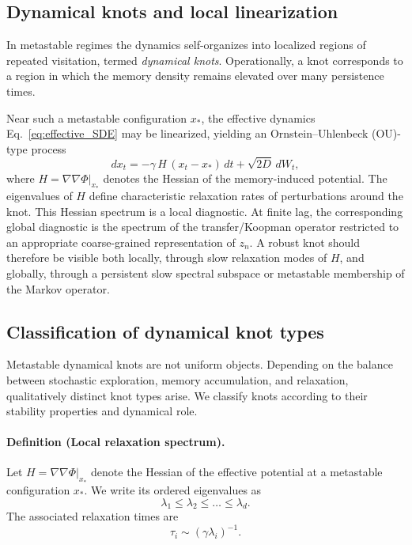 \documentclass[reprint,amsmath,amssymb,aps,prl,nofootinbib,floatfix]{revtex4-2}
\begin{document}
\subsection{Dynamical knots and local linearization}
In metastable regimes the dynamics self-organizes into localized regions of repeated visitation, termed \emph{dynamical knots}. 
Operationally, a knot corresponds to a region in which the memory density remains elevated over many persistence times.

Near such a metastable configuration $x_\ast$, the effective dynamics Eq.~\eqref{eq:effective_SDE} may be linearized, yielding an Ornstein--Uhlenbeck (OU)-type process \cite{OrnsteinUhlenbeck1930}
\begin{equation}
dx_t
= -\gamma\,H\,(x_t-x_\ast)\,dt + \sqrt{2D}\,dW_t, \label{eq:OU_local}
\end{equation}
where $H=\nabla\nabla\Phi|_{x_\ast}$ denotes the Hessian of the memory-induced potential.
The eigenvalues of $H$ define characteristic relaxation rates of perturbations around the knot.
This Hessian spectrum is a local diagnostic.
At finite lag, the corresponding global diagnostic is the spectrum of the transfer/Koopman operator restricted to an appropriate coarse-grained representation of $z_n$.
A robust knot should therefore be visible both locally, through slow relaxation modes of $H$, and globally, through a persistent slow spectral subspace or metastable membership of the Markov operator.

\subsection{Classification of dynamical knot types}

Metastable dynamical knots are not uniform objects.
Depending on the balance between stochastic exploration, memory accumulation,
and relaxation, qualitatively distinct knot types arise.
We classify knots according to their stability properties and dynamical role.

\paragraph{Definition (Local relaxation spectrum).}
Let $H=\nabla\nabla\Phi|_{x_\ast}$ denote the Hessian of the effective potential
at a metastable configuration $x_\ast$.
We write its ordered eigenvalues as
\begin{equation}
\lambda_1 \le \lambda_2 \le \dots \le \lambda_d .
\end{equation}
The associated relaxation times are
\begin{equation}
\tau_i \sim (\gamma \lambda_i)^{-1}.
\end{equation}
\end{document}
